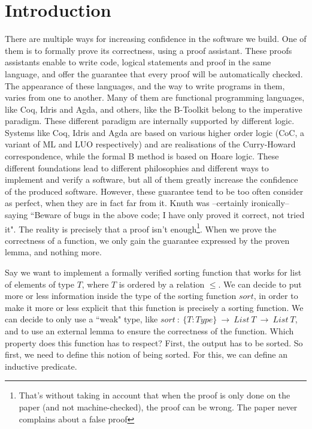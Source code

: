 \section{Introduction}


There are multiple ways for increasing confidence in the software we build. One of them is to formally prove its correctness, using a proof assistant. These proofs assistants enable to write code, logical statements and proof in the same language, and offer the guarantee that every proof will be automatically checked. The appearance of these languages, and the way to write programs in them, varies from one to another. Many of them are functional programming languages, like Coq, Idris and Agda, and others, like the B-Toolkit belong to the imperative paradigm. These different paradigm are internally supported by different logic. Systems like Coq, Idris and Agda are based on various higher order logic (CoC, a variant of ML and LUO respectively) and are realisations of the Curry-Howard correspondence, while the formal B method is based on Hoare logic. These different foundations lead to different philosophies and different ways to implement and verify a software, but all of them greatly increase the confidence of the produced software. However, these guarantee tend to be too often consider as perfect, when they are in fact far from it. Knuth was --certainly ironically-- saying ``Beware of bugs in the above code; I have only proved it correct, not tried it". The reality is precisely that a proof isn't enough\footnote{That's without taking in account that when the proof is only done on the paper (and not machine-checked), the proof can be wrong. The paper never complains about a false proof}. When we prove the correctness of a function, we only gain the guarantee expressed by the proven lemma, and nothing more. 

Say we want to implement a formally verified sorting function that works for list of elements of type $T$, where $T$ is ordered by a relation $\leq$.
We can decide to put more or less information inside the type of the sorting function $sort$, in order to make it more or less explicit that this function is precisely a sorting function. We can decide to only use a ``weak" type, like $sort\ :\ \{T:Type\}\ \rightarrow\ List\ T\ \rightarrow\ List\ T$, and to use an external lemma to ensure the correctness of the function. Which property does this function has to respect? First, the output has to be sorted. So first, we need to define this notion of being sorted. For this, we can define an inductive predicate.

